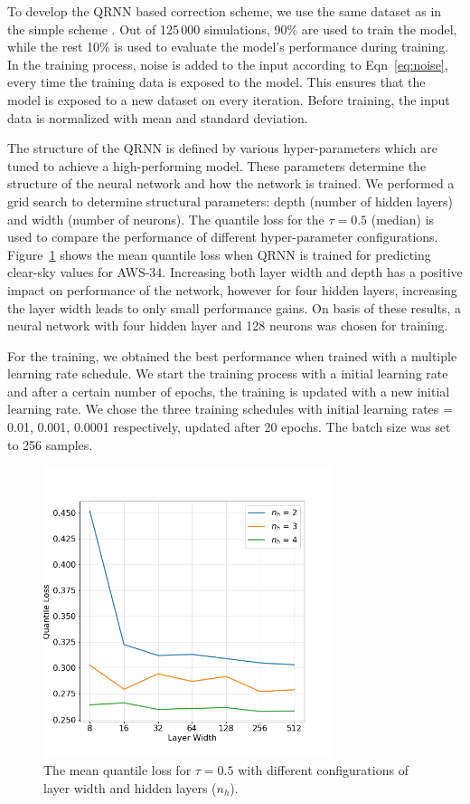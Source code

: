 \documentclass[12pt]{article}
\begin{document}
To develop the QRNN based correction scheme, we use the same dataset as in the simple scheme . Out of 125\,000 simulations, 90\% are used to train the model, while the rest 10\% is used to evaluate the model's performance during training. In the training process, noise is added to the input according to Eqn~\ref{eq:noise}, every time the training data is exposed to the model. This ensures that the model is exposed to a new dataset on every iteration. Before training, the input data is normalized with mean and standard deviation.

The structure of the QRNN is defined by various hyper-parameters which are tuned to achieve a high-performing model. These parameters determine the structure of the neural network and how the network is trained. We performed a grid search to determine structural parameters: depth (number of hidden layers) and width (number of neurons). The quantile loss for the $\tau = 0.5$ (median) is used to compare the performance of different hyper-parameter configurations. Figure~\ref{fig:quantile_loss_median} shows the mean quantile loss when QRNN is trained for predicting clear-sky values for AWS-34. Increasing both layer width and depth has a positive impact on performance of the network, however for four hidden layers, increasing the layer width leads to only small performance gains. On basis of these results, a neural network with four hidden layer and 128 neurons was chosen for training.

For the training, we obtained the best performance when trained with a multiple learning rate schedule. We start the training process with a initial learning rate and after a certain number of epochs, the training is updated with a new initial learning rate. We chose the three training schedules with initial learning rates = 0.01, 0.001, 0.0001 respectively, updated after 20 epochs. The batch size was set to 256 samples.
%
\begin{figure}[!ht]
	\centering
	\includegraphics[height=85mm]{quantile_loss_median.png}
	\caption{The mean quantile loss for $\tau = 0.5$ with different configurations of layer width and hidden layers ($n_h$).}
	\label{fig:quantile_loss_median}
\end{figure}
%
\end{document}
